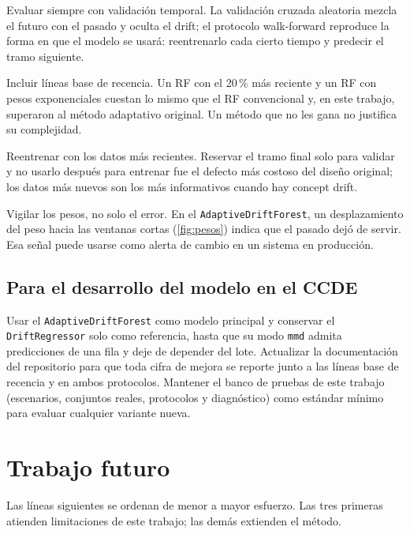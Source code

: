 \documentclass[11pt,a4paper]{article}
\begin{document}
Evaluar siempre con validación temporal. La validación cruzada aleatoria mezcla el futuro con el
pasado y oculta el drift; el protocolo walk-forward reproduce la forma en que el modelo se usará:
reentrenarlo cada cierto tiempo y predecir el tramo siguiente.

Incluir líneas base de recencia. Un RF con el 20\,\% más reciente y un RF con pesos exponenciales
cuestan lo mismo que el RF convencional y, en este trabajo, superaron al método adaptativo original.
Un método que no les gana no justifica su complejidad.

Reentrenar con los datos más recientes. Reservar el tramo final solo para validar y no usarlo después
para entrenar fue el defecto más costoso del diseño original; los datos más nuevos son los más
informativos cuando hay concept drift.

Vigilar los pesos, no solo el error. En el \texttt{AdaptiveDriftForest}, un desplazamiento del peso
hacia las ventanas cortas (\cref{fig:pesos}) indica que el pasado dejó de servir. Esa señal puede
usarse como alerta de cambio en un sistema en producción.

\subsection{Para el desarrollo del modelo en el CCDE}

Usar el \texttt{AdaptiveDriftForest} como modelo principal y conservar el \texttt{DriftRegressor}
solo como referencia, hasta que su modo \texttt{mmd} admita predicciones de una fila y deje de
depender del lote. Actualizar la documentación del repositorio para que toda cifra de mejora se
reporte junto a las líneas base de recencia y en ambos protocolos. Mantener el banco de pruebas de
este trabajo (escenarios, conjuntos reales, protocolos y diagnóstico) como estándar mínimo para
evaluar cualquier variante nueva.

\section{Trabajo futuro}\label{sec:futuro}

Las líneas siguientes se ordenan de menor a mayor esfuerzo. Las tres primeras atienden limitaciones
de este trabajo; las demás extienden el método.
\end{document}
